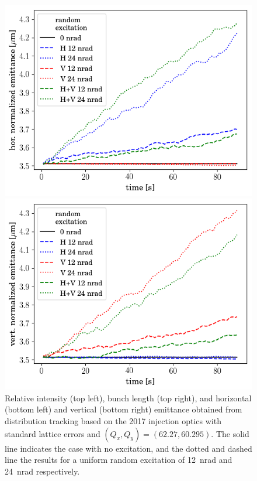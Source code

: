 \documentclass[%
 reprint,
 amsmath,amssymb,
 aps,
prstab,
longbibliography
]{revtex4-1}
\begin{document}
\begin{figure}
\begin{minipage}[t]{0.49\linewidth}
		\includegraphics[width=1.0\linewidth]{2017injerra2b2u_ranadt_3_5um_emit1.png}
	\end{minipage}	
	\begin{minipage}[t]{0.49\linewidth}
		\centering
		\includegraphics[width=1.0\linewidth]{2017injerra2b2u_ranadt_3_5um_emit2.png}
	\end{minipage}
	\caption{\label{fig:ransim} Relative intensity (top left), bunch length (top right), and horizontal (bottom left) and vertical (bottom right) emittance obtained from distribution tracking based on the 2017 injection optics with standard lattice errors and $(Q_x,Q_y)=(62.27,60.295)$. The solid line indicates the case with no excitation, and the dotted and dashed line the results for a uniform random excitation of 12~nrad and 24~nrad respectively.}
      \end{figure}
\end{document}

